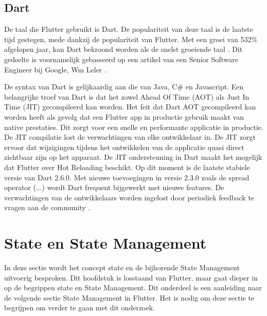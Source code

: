 \subsection{Dart}
\label{ch:dart}
De taal die Flutter gebruikt is Dart. De populariteit van deze taal is de laatste tijd gestegen, mede dankzij de populariteit van Flutter. Met een groei van 532\% afgelopen jaar, kan Dart bekroond worden als de snelst groeiende taal \autocite{Chan2019}. 
Dit gedeelte is voornamelijk gebasseerd op een artikel van een Senior Software Engineer bij Google, Wm Leler \autocite{Leler2017a}.

De syntax van Dart is gelijkaardig aan die van Java, C\# en Javascript.
Een belangrijke troef van Dart is dat het zowel Ahead Of Time (AOT) als Just In Time (JIT) gecompileerd kan worden. Het feit dat Dart AOT gecompileerd kan worden heeft als gevolg dat een Flutter app in productie gebruik maakt van native prestaties. Dit zorgt voor een snelle en performante applicatie in productie.
De JIT compilatie lost de verwachtingen van elke ontwikkelaar in. De JIT zorgt ervoor dat wijzigingen tijdens het ontwikkelen van de applicatie quasi direct zichtbaar zijn op het apparaat. De JIT ondersteuning in Dart maakt het mogelijk dat Flutter over Hot Reloading beschikt. \autocite{Leler2017a}
\newline
Op dit moment is de laatste stabiele versie van Dart 2.6.0. Met nieuwe toevoegingen in versie 2.3.0 zoals de spread operator (...) wordt Dart frequent bijgewerkt met nieuwe features. De verwachtingen van de ontwikkelaars worden ingelost door periodiek feedback te vragen aan de community \autocite{Thomsen2019}.

\section{State en State Management}
In deze sectie wordt het concept state en de bijhorende State Management uitvoerig besproken. Dit hoofdstuk is losstaand van Flutter, maar gaat dieper in op de begrippen state en State Management. Dit onderdeel is een aanleiding naar de volgende sectie State Management in Flutter. Het is nodig om deze sectie te begrijpen om verder te gaan met dit onderzoek.

